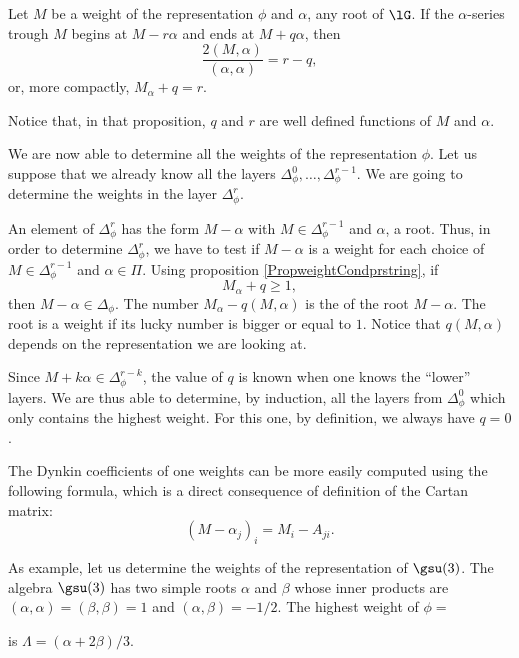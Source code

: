 \begin{proposition}     \label{PropweightCondprstring}
Let $M$ be a weight of the representation $\phi$ and $\alpha$, any root of $\lG$. If the $\alpha$-series trough $M$ begins at $M-r\alpha$ and ends at $M+q\alpha$, then
\begin{equation}
    \frac{ 2(M,\alpha) }{ (\alpha,\alpha) }=r-q,
\end{equation}
or, more compactly, $M_{\alpha}+q=r$.
\end{proposition}
Notice that, in that proposition, $q$ and $r$ are well defined functions of $M$ and $\alpha$.

We are now able to determine all the weights of the representation $\phi$. Let us suppose that we already know all the layers $\Delta_{\phi}^0,\ldots,\Delta_{\phi}^{r-1}$. We are going to determine the weights in the layer $\Delta_{\phi}^r$.

An element of $\Delta_{\phi}^r$ has the form $M-\alpha$ with $M\in\Delta_{\phi}^{r-1}$ and $\alpha$, a root. Thus, in order to determine $\Delta_{\phi}^r$, we have to test if $M-\alpha$ is a weight for each choice of $M\in\Delta_{\phi}^{r-1}$ and $\alpha\in\Pi$. Using proposition \ref{PropweightCondprstring}, if
\begin{equation}
    M_{\alpha}+q \geq 1,
\end{equation}
then $M-\alpha\in\Delta_{\phi}$. The number $M_{\alpha}-q(M,\alpha)$ is the  of the root $M-\alpha$. The root is a weight if its lucky number is bigger or equal to $1$. Notice that $q(M,\alpha)$ depends on the representation we are looking at.

Since $M+k\alpha\in\Delta_{\phi}^{r-k}$, the value of $q$ is known when one knows the ``lower'' layers. We are thus able to determine, by induction, all the layers from $\Delta^0_{\phi}$ which only contains the highest weight. For this one, by definition, we always have $q=0$.

The Dynkin coefficients of one weights can be more easily computed using the following formula, which is a direct consequence of definition of the Cartan matrix:
\begin{equation}        \label{EqCoefDynkMalpha}
    (M-\alpha_j)_i=M_i-A_{ji}.
\end{equation}

As example, let us determine the weights of the representation  of \( \gsu(3)\).
%  
The algebra $\gsu(3)$ has two simple roots $\alpha$ and $\beta$ whose inner products are $(\alpha,\alpha)=(\beta,\beta)=1$ and $(\alpha,\beta)=-1/2$. The highest weight of $\phi=$

is $\Lambda=(\alpha+2\beta)/3$.


